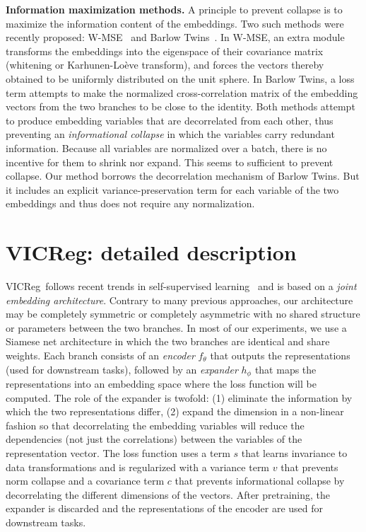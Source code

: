 \documentclass{article} %
\newcommand{\algo}{VICReg}
\newcommand{\expander}{expander }
\begin{document}
\vspace{2mm}
\noindent \textbf{Information maximization methods.} A principle to prevent collapse is to maximize the information content of the embeddings. Two such methods were recently proposed: W-MSE~\cite{ermolov2021whitening} and Barlow Twins~\cite{zbontar2021barlow}.
In W-MSE, an extra module transforms the embeddings into the eigenspace of their covariance matrix (whitening or Karhunen-Loève transform), and forces the vectors thereby obtained to be uniformly distributed on the unit sphere.
In Barlow Twins, a loss term attempts to make the normalized cross-correlation matrix of the embedding vectors from the two branches to be close to the identity. 
Both methods attempt to produce embedding variables that are decorrelated from each other, thus preventing an {\em informational collapse} in which the variables carry redundant information. Because all variables are normalized over a batch, there is no incentive for them to shrink nor expand. This seems to sufficient to prevent collapse.
Our method borrows the decorrelation mechanism of Barlow Twins. But it includes an explicit variance-preservation term for each variable of the two embeddings and thus does not require any normalization.
    
\section{VICReg: detailed description} \label{sec:method}

\algo \ follows recent trends in self-supervised learning~\cite{caron2020swav, grill2020byol, chen2020simsiam, zbontar2021barlow, chen2020simclr} and is based on a {\em joint embedding architecture}. Contrary to many previous approaches, our architecture may be completely symmetric or completely asymmetric with no shared structure or parameters between the two branches. In most of our experiments, we use a Siamese net architecture in which the two branches are identical and share weights. Each branch consists of an {\em encoder} $f_{\theta}$ that outputs the representations (used for downstream tasks), followed by an {\em expander} $h_{\phi}$ that maps the representations into an embedding space where the loss function will be computed. The role of the \expander is twofold: (1) eliminate the information by which the two representations differ, (2) expand the dimension in a non-linear fashion so that decorrelating the embedding variables will reduce the dependencies (not just the correlations) between the variables of the representation vector. The loss function uses a term $s$ that learns invariance to data transformations and is regularized with a variance term $v$ that prevents norm collapse and a covariance term $c$ that prevents informational collapse by decorrelating the different dimensions of the vectors. After pretraining, the \expander is discarded and the representations of the encoder are used for downstream tasks.
\end{document}
